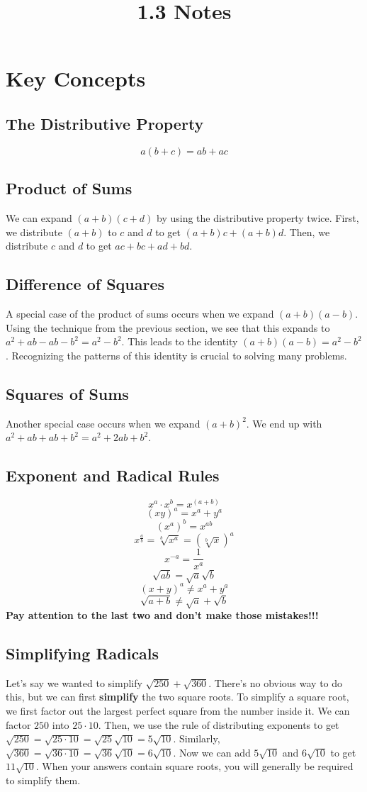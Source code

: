\documentclass{article}
\title{1.3 Notes}
\author{}
\date{}
\begin{document}
    \maketitle
    \section*{Key Concepts}
    \subsection*{The Distributive Property}
    \[a(b + c) = ab + ac\]
    \subsection*{Product of Sums}
    We can expand $(a + b)(c + d)$ by using the distributive property twice. First, we distribute $(a + b)$ to $c$ and $d$ to get $(a + b)c + (a + b)d$. Then, we distribute $c$ and $d$ to get $ac + bc + ad + bd$.
    \subsection*{Difference of Squares}
    A special case of the product of sums occurs when we expand $(a + b)(a - b)$. Using the technique from the previous section, we see that this expands to $a^2 + ab - ab - b^2 = a^2 - b^2$. This leads to the identity $(a + b)(a - b) = a^2 - b^2$. Recognizing the patterns of this identity is crucial to solving many problems.
    \subsection*{Squares of Sums}
    Another special case occurs when we expand $(a + b)^2$. We end up with $a^2 + ab + ab + b^2 = a^2 + 2ab + b^2$.
    \subsection*{Exponent and Radical Rules}
    \[x^a \cdot x^b = x^{(a + b)}\]
    \[(xy)^a = x^a + y^a\]
    \[(x^a)^b = x^{ab}\]
    \[x^{\frac{a}{b}} = \sqrt[b]{x^a} = \left(\sqrt[b]{x}\right)^a\]
    \[x^{-a} = \frac{1}{x^a}\]
    \[\sqrt{ab} = \sqrt{a}\sqrt{b}\]
    \[(x + y)^a \neq x^a + y^a\]
    \[\sqrt{a + b} \neq \sqrt{a} + \sqrt{b}\]
    \textbf{Pay attention to the last two and don't make those mistakes!!!}
    \subsection*{Simplifying Radicals}
    Let's say we wanted to simplify $\sqrt{250} + \sqrt{360}$. There's no obvious way to do this, but we can first \textbf{simplify} the two square roots. To simplify a square root, we first factor out the largest perfect square from the number inside it. We can factor $250$ into $25 \cdot 10$. Then, we use the rule of distributing exponents to get $\sqrt{250} = \sqrt{25 \cdot 10} = \sqrt{25}\sqrt{10} = 5\sqrt{10}$. Similarly, $\sqrt{360} = \sqrt{36 \cdot 10} = \sqrt{36}\sqrt{10} = 6\sqrt{10}$. Now we can add $5\sqrt{10}$ and $6\sqrt{10}$ to get $11\sqrt{10}$. When your answers contain square roots, you will generally be required to simplify them.
\end{document}
